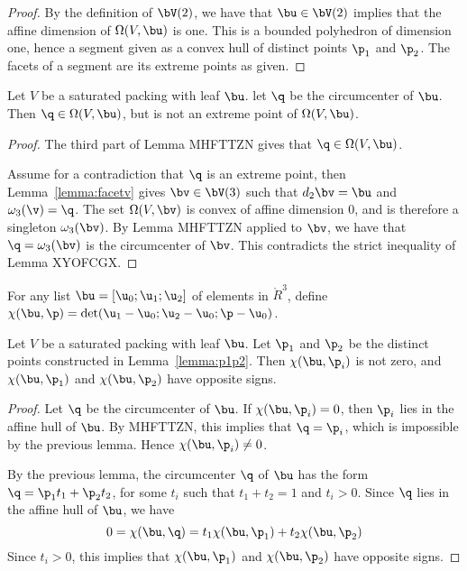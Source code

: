 \begin{proof}  By the definition of $\bV(2)$,  we have that $\bu\in \bV(2)$ implies that
the affine dimension of $\Omega(V,\bu)$ is one.  This is a bounded polyhedron of dimension one,
hence a segment given as a convex hull of distinct points $\p_1$ and $\p_2$.  The facets of a segment
are its extreme points as given.
\end{proof}

\begin{lemma}  Let $V$ be a saturated packing with leaf $\bu$.  let $\q$ be the circumcenter of $\bu$.
Then $\q\in\Omega(V,\bu)$, but is not an extreme point of $\Omega(V,\bu)$.
\end{lemma}

\begin{proof} The third part of Lemma MHFTTZN gives that $\q\in \Omega(V,\bu)$. 

Assume for a contradiction that
$\q$ is an extreme point, then Lemma~\ref{lemma:facetv} gives $\bv\in \bV(3)$ such that
$d_2\bv = \bu$ and $\omega_3(\v)=\q$.  The set $\Omega(V,\bv)$ is convex of affine dimension $0$,
and is therefore a singleton $\omega_3(\bv)$.   By Lemma MHFTTZN applied to $\bv$, we have that
$\q=\omega_3(\bv)$ is the circumcenter of $\bv$.  This contradicts the strict inequality of Lemma XYOFCGX.
\end{proof}

\begin{definition}[$\chi$] For any list $\bu = [\u_0;\u_1;\u_2]$ of  elements in $\ring{R}^3$, define 
$\chi(\bu,\p) = \det(\u_1-\u_0;\u_2-\u_0;\p-\u_0)$.
\end{definition}

\begin{lemma} Let $V$ be a saturated packing with leaf $\bu$.  Let $\p_1$ and $\p_2$ be the
distinct points constructed in Lemma~\ref{lemma:p1p2}.  Then $\chi(\bu,\p_i)$ is not zero,
and $\chi(\bu,\p_1)$ and $\chi(\bu,\p_2)$ have opposite signs.
\end{lemma}

\begin{proof}
Let $\q$ be the circumcenter of $\bu$.
If $\chi(\bu,\p_i) = 0$, then $\p_i$ lies in the affine hull of $\bu$.   By MHFTTZN, this implies that
$\q = \p_i$, which is impossible by the previous lemma.  Hence $\chi(\bu,\p_i)\ne 0$.

By the previous lemma, the circumcenter $\q$ of $\bu$ has the form $\q=\p_1 t_1 + \p_2 t_2$,
for some $t_i$ such that $t_1+t_2=1$ and $t_i>0$.  Since $\q$ lies in the affine hull of $\bu$, we have
\[
0 = \chi(\bu,\q) = t_1 \chi(\bu,\p_1) + t_2 \chi(\bu,\p_2)
\]
Since $t_i>0$, this implies that $\chi(\bu,\p_1)$ and $\chi(\bu,\p_2)$ have opposite signs.
\end{proof}

